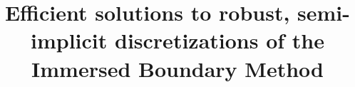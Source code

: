 \documentclass[preprint,12pt]{elsarticle}
\begin{document}
\begin{frontmatter}



\title{Efficient solutions to robust, semi-implicit discretizations of the Immersed Boundary Method}


\end{frontmatter}
\end{document}
